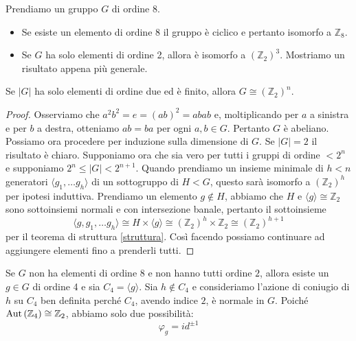 \begin{multicols}{2}
	Prendiamo un gruppo $ G $ di ordine 8.
\begin{itemize}
	\item Se esiste un elemento di ordine 8 il gruppo è ciclico e pertanto isomorfo a $ \mathbb{Z}_8 $.
	\item Se $ G $ ha solo elementi di ordine 2, allora è isomorfo a $ \left(\mathbb{Z}_2\right)^3 $. Mostriamo un risultato appena più generale. 
\end{itemize}
\begin{theorem}
	Se $ |G| $ ha solo elementi di ordine due ed è finito, allora $ G \cong \left(\mathbb{Z}_2\right)^n $.
\end{theorem}
\begin{proof}
	Osserviamo che $ a^2b^2 = e = (ab)^2 = abab $ e, moltiplicando per $ a $ a sinistra e per $ b $ a destra, otteniamo $ ab = ba $ per ogni $ a, b \in G $. Pertanto $ G $ è abeliano. Possiamo ora procedere per induzione sulla dimensione di $ G $. Se $ |G| = 2 $ il risultato è chiaro. Supponiamo ora che sia vero per tutti i gruppi di ordine $ < 2^n $ e supponiamo $ 2^ n \leq |G| < 2^{n+1} $. Quando prendiamo un insieme minimale di $ h < n $ generatori $ \langle g_1, \dots g_h \rangle $ di un sottogruppo di $ H < G $, questo sarà isomorfo a $ \left(\mathbb{Z}_2\right)^h $ per ipotesi induttiva. Prendiamo un elemento $ g \notin H$, abbiamo che $ H $ e $ \langle g \rangle \cong \mathbb{Z}_2 $ sono sottoinsiemi normali e con intersezione banale, pertanto il sottoinsieme \[ \langle g, g_1, \dots g_h \rangle \cong H \times\langle g \rangle \cong \left(\mathbb{Z}_2\right)^h \times \mathbb{Z}_2 \cong \left(\mathbb{Z}_2\right)^{h+1} \]
	per il teorema di struttura \ref{struttura}.
	Così facendo possiamo continuare ad aggiungere elementi fino a prenderli tutti.
\end{proof}
Se $ G $ non ha elementi di ordine $ 8 $ e non hanno tutti ordine $ 2 $, allora esiste un $ g \in G $ di ordine 4 e sia $ C_4 = \langle g \rangle $. Sia $ h \notin C_4 $ e consideriamo l'azione di coniugio di $ h $ su $ C_4 $
ben definita perché $ C_4 $, avendo indice $ 2 $, è normale in $ G $. Poiché $ \mathrm{Aut}\left( \mathbb{Z}_4 \right) \cong \mathbb{Z}_2 $, abbiamo solo due possibilità: $$  \varphi_g =  id^{\pm 1}  $$


\end{multicols}
